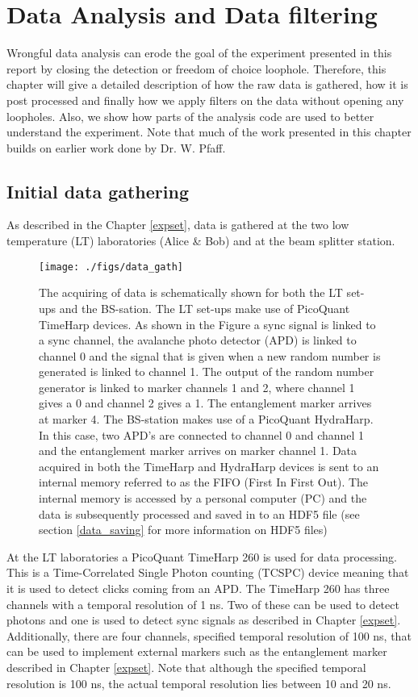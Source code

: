 \color{tudelft-cyan}
\chapter{Data Analysis and Data filtering}
\color{black}

Wrongful data analysis can erode the goal of the experiment presented in this report by closing the detection or freedom of choice loophole. Therefore, this chapter will give a detailed description of how the raw data is gathered, how it is post processed and finally how we apply filters on the data without opening any loopholes. Also, we show how parts of the analysis code are used to better understand the experiment. Note that much of the work presented in this chapter builds on earlier work done by Dr. W. Pfaff.


\color{tudelft-cyan}
\section{Initial data gathering}
\color{black}
As described in the Chapter \ref{expset}, data is gathered at the two low temperature (LT) laboratories (Alice \& Bob) and at the beam splitter station. 

\begin{figure}[ht]\centering
\texttt{[image: ./figs/data\_gath]}
\caption{The acquiring of data is schematically shown for both the LT set-ups and the BS-sation. The LT set-ups make use of PicoQuant TimeHarp devices. As shown in the Figure a sync signal is linked to a sync channel, the avalanche photo detector (APD) is linked to channel 0 and the signal that is given when a new random number is generated is linked to channel 1. The output of the random number generator is linked to marker channels 1 and 2, where channel 1 gives a 0 and channel 2 gives a 1. The entanglement marker arrives at marker 4. The BS-station makes use of a PicoQuant HydraHarp. In this case, two APD's are connected to channel 0 and channel 1 and the entanglement marker arrives on marker channel 1. Data acquired in both the TimeHarp and HydraHarp devices is sent to an internal memory referred to as the FIFO (First In First Out). The internal memory is accessed by a personal computer (PC) and the data is subsequently processed and saved in to an HDF5 file (see section \ref{data_saving} for more information on HDF5 files)}
\label{fig:SSRO_data_gath}
\end{figure}
At the LT laboratories a PicoQuant TimeHarp 260 is used for data processing. This is a Time-Correlated Single Photon counting (TCSPC) device meaning that it is used to detect clicks coming from an APD. The TimeHarp 260 has three channels with a temporal resolution of 1 ns. Two of these can be used to detect photons and one is used to detect sync signals as described in Chapter \ref{expset}. Additionally, there are four channels, specified temporal resolution of 100 ns, that can be used to implement external markers such as the entanglement marker described in Chapter \ref{expset}. Note that although the specified temporal resolution is 100 ns, the actual temporal resolution lies between 10 and 20 ns.  

